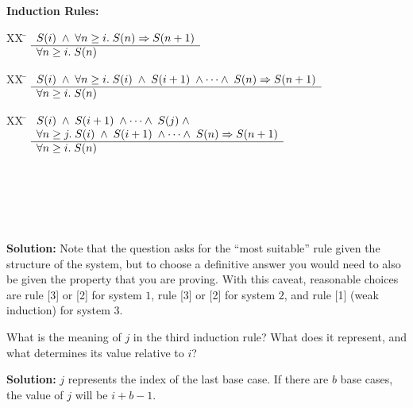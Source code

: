 \documentclass[]{exam}
\theoremstyle{definition}
\begin{document}
\begin{questions}
\begin{multicols}{2}
\columnbreak
{\bf Induction Rules:}\\
\begin{tabbing}
[1]XX \=  \kill
[1] \>
	\(\begin{array}[t]{l}
	S(i) \;\wedge\; \forall n \geq i.\;S(n) \Rightarrow S(n+1) \\
	\hline
	\forall n \geq i. \; S(n)
	\end{array}\) %
\end{tabbing}

\begin{tabbing}
[2]XX \=  \kill
[2] \>
	\(\begin{array}[t]{l}
	S(i) \;\wedge\; \forall n \geq i.\;S(i)\;\wedge\;S(i+1)\;\wedge\cdots\wedge\;S(n) \Rightarrow S(n+1) \\
	\hline
	\forall n \geq i. \; S(n)
	\end{array}\)
\end{tabbing}

\begin{tabbing}
[3]XX \=  \kill
[3] \>
	\(\begin{array}[t]{l}
	S(i) \;\wedge\; S(i+1)\;\wedge\cdots\wedge\;S(j)\;\wedge\; \\
\forall n \geq j.\;S(i)\;\wedge\;S(i+1)\;\wedge\cdots\wedge\;S(n) \Rightarrow S(n+1) \\
	\hline
	\forall n \geq i. \; S(n)
	\end{array}\) %
\end{tabbing}
~\\
~\\
~\\
~\\
    
\end{multicols}

{\bf Solution:} Note that the question asks for the ``most suitable'' rule given
the structure of the system, but to choose a definitive answer you would need to
also be given the property that you are proving. With this caveat, reasonable
choices are rule [3] or [2] for system $1$, rule [3] or [2] for system $2$, and 
rule [1] (weak induction) for system $3$. 

\question What is the meaning of $j$ in the third induction rule? What does it
represent, and what determines its value relative to $i$?

{\bf Solution:} $j$ represents the index of the last base case. If there are
$b$ base cases, the value of $j$ will be $i + b - 1$.


\end{questions}
\end{document}
